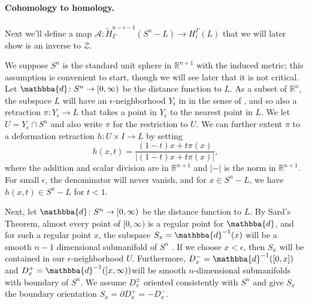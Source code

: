 \documentclass[12pt]{article}
\theoremstyle{plain}
\theoremstyle{definition}
\theoremstyle{remark}
\newcommand{\td}[1]{\tilde{#1}}
\newcommand{\R}{\mathbb{R}}
\newcommand{\bd}{\partial}
\newcommand{\mc}[1]{\mathcal{#1}}
\begin{document}
\paragraph{Cohomology to homology.} Next we'll define a map $\mc A \colon \td H^{n-i-1}_\Gamma(S^n-L) \to H_i^\Gamma(L)$ that we will later show is an inverse to $\mc Z$.

We suppose $S^n$ is the standard unit sphere in $\R^{n+1}$ with the induced metric; this assumption is convenient to start, though we will see later that it is not critical.
Let $\mathbba{d} \colon S^n \to [0,\infty)$ be the distance function to $L$.
As a subset of $\R^n$, the subspace $L$ will have an $\epsilon$-neighborhood $Y_\epsilon$ in in the sense of \cite[Section 2.3]{GuPo74}, and so also a retraction $\pi \colon Y_\epsilon \to L$ that takes a point in $Y_\epsilon$ to the nearest point in $L$.
We let $U = Y_\epsilon \cap S^n$ and also write $\pi$ for the restriction to $U$.
We can further extent $\pi$ to a deformation retraction $h \colon U \times I \to L$ by setting
$$h(x,t) = \frac{(1-t)x + t\pi(x)}{|(1-t)x + t\pi(x)|},$$
where the addition and scalar division are in $\R^{n+1}$ and $|-|$ is the norm in $\R^{n+1}$.
For small $\epsilon$, the denominator will never vanish, and for $x \in S^n -L$, we have $h(x,t) \in S^n -L$ for $t < 1$.

Next, let $\mathbba{d} \colon S^n \to [0,\infty)$ be the distance function to $L$.
By Sard's Theorem, almost every point of $[0,\infty)$ is a regular point for $\mathbba{d}$, and for such a regular point $x$, the subspace $S_x = \mathbba{d}^{-1}(x)$ will be a smooth $n-1$ dimensional submanifold of $S^n$ \cite[Section 2.1]{GuPo74}.
If we choose $x < \epsilon$, then $S_x$ will be contained in our $\epsilon$-neighborhood $U$.
Furthermore, $D_x^- = \mathbba{d}^{-1}([0,x])$ and $D_x^+ = \mathbba{d}^{-1}([x,\infty))$will be smooth $n$-dimensional submanifolds with boundary of $S^n$.
We assume $D^{\pm}_x$ oriented consistently with $S^n$ and give $S_x$ the boundary orientation $S_x = \bd D_x^+ = -D_x^-$.
\end{document}
